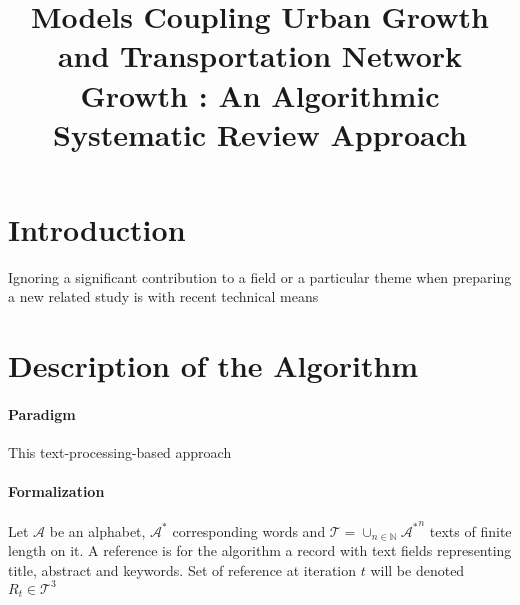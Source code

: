 


\title{Models Coupling Urban Growth and Transportation Network Growth : An Algorithmic Systematic Review Approach
}
\author{}
\date{}


\maketitle

\begin{abstract}

\end{abstract}





\section{Introduction}


Ignoring a significant contribution to a field or a particular theme when preparing a new related study is with recent technical means 



\section{Description of the Algorithm}

\paragraph{Paradigm}



This text-processing-based approach 


\paragraph{Formalization}
Let $\mathcal{A}$ be an alphabet, $\mathcal{A}^{\ast}$ corresponding words and $\mathcal{T}=\cup_{n\in \mathbb{N}}{\mathcal{A}^{\ast}}^n$ texts of finite length on it. A reference is for the algorithm a record with text fields representing title, abstract and keywords. Set of reference at iteration $t$ will be denoted $R_{t}\in \mathcal{T}^3$


